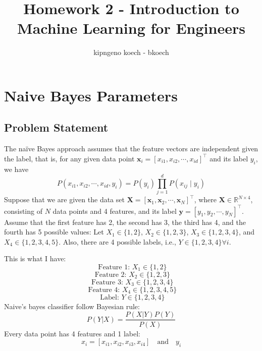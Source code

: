 \documentclass[a3paper,12pt]{extarticle} %
\begin{document}
\author{kipngeno koech - bkoech}
\title{Homework 2 - Introduction to Machine Learning for Engineers}
\maketitle

\medskip

\maketitle
\section{Naive Bayes Parameters}
\subsection*{Problem Statement}
The na\"ive Bayes approach assumes that the feature vectors are independent given the label, that is, for any given data point $\mathbf{x}_i = [x_{i1}, x_{i2}, \cdots, x_{id}]^\top$ and its label $y_i$, we have
\[
P(x_{i1}, x_{i2}, \cdots, x_{id}, y_i) = P(y_i) \prod_{j=1}^{d} P(x_{ij} \mid y_i)
\]
Suppose that we are given the data set $\mathbf{X} = [\mathbf{x}_1, \mathbf{x}_2, \cdots, \mathbf{x}_N]^\top$, where $\mathbf{X} \in \mathbb{R}^{N \times 4}$, consisting of $N$ data points and 4 features, and its label $\mathbf{y} = [y_1, y_2, \cdots, y_N]^\top$. Assume that the first feature has 2, the second has 3, the third has 4, and the fourth has 5 possible values: Let $X_1 \in \{1, 2\}$, $X_2 \in \{1, 2, 3\}$, $X_3 \in \{1, 2, 3, 4\}$, and $X_4 \in \{1, 2, 3, 4, 5\}$. Also, there are 4 possible labels, i.e., $Y \in \{1, 2, 3, 4\} \forall i$.

This is what I have:
\[
\text{ Feature 1: } X_1 \in \{1, 2\}
\]
\[
\text{ Feature 2: } X_2 \in \{1, 2, 3\}
\]
\[
\text{ Feature 3: } X_3 \in \{1, 2, 3, 4\}
\]
\[
\text{ Feature 4: } X_4 \in \{1, 2, 3, 4, 5\}
\]
\[
\text{ Label: } Y \in \{1, 2, 3, 4\}
\]
Naive's bayes classifier follow Bayesian rule:
\[
P(Y|X) = \frac{P(X|Y)P(Y)}{P(X)}
\]
Every data point has 4 features and 1 label:
\[
    x_i = [x_{i1}, x_{i2}, x_{i3}, x_{i4}] \quad \text{and} \quad y_i
\]
\end{document}

